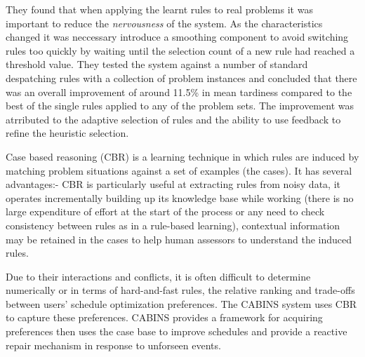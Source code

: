 They found that when applying the learnt rules to real problems it was important to reduce the \emph{nervousness} of the system. As the characteristics changed it was neccessary introduce a smoothing component to avoid switching rules too quickly by waiting until the selection count of a new rule had reached a threshold value. They tested the system against a number of standard despatching rules with a collection of problem instances and concluded that there was an overall improvement of around 11.5\% in mean tardiness compared to the best of the single rules applied to any of the problem sets. The improvement was atrributed to the adaptive selection of rules and the ability to use feedback to refine the heuristic selection.


Case based reasoning (CBR) is a learning technique in which rules are induced by matching problem situations against a set of examples (the cases). It has several advantages:- CBR is particularly useful at extracting rules from noisy data, it operates incrementally building up its knowledge base while working (there is no large expenditure of effort at the start of the process or any need to check consistency between rules as in a rule-based learning), contextual information may be retained in the cases to help human assessors to understand the induced rules.

Due to their interactions and conflicts, it is often difficult to determine numerically or in terms of hard-and-fast rules, the relative ranking and trade-offs between users' schedule optimization preferences. The CABINS system \cite{miyashita95cabins} uses CBR to capture these preferences. CABINS provides a framework for acquiring preferences then uses the case base to improve schedules and provide a reactive repair mechanism in response to unforseen events. 

